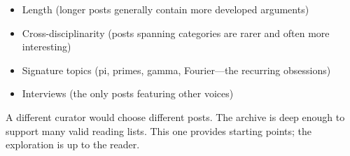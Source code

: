 \begin{itemize}
\item Length (longer posts generally contain more developed arguments)
\item Cross-disciplinarity (posts spanning categories are rarer and often more interesting)
\item Signature topics (pi, primes, gamma, Fourier---the recurring obsessions)
\item Interviews (the only posts featuring other voices)
\end{itemize}

A different curator would choose different posts. The archive is deep enough to support many valid reading lists. This one provides starting points; the exploration is up to the reader.
